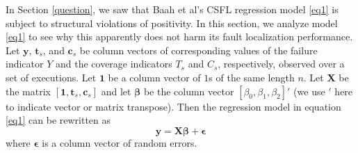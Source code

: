 In Section \ref{question}, we saw that Baah et al’s CSFL regression model \eqref{eq1} is subject to structural violations of positivity.  In this section, we analyze model \eqref{eq1} to see why this apparently does not harm its fault localization performance.  Let $\mathbf{y}$, $\mathbf{t}_s$, and $\mathbf{c}_s$ be column vectors of corresponding values of the failure indicator $Y$ and the coverage indicators $T_s$ and $C_s$, respectively, observed over a set of executions.  Let $\mathbf{1}$ be a column vector of $1$s of the same length $n$.  Let $\mathbf{X}$ be the matrix $[\mathbf{1}, \mathbf{t}_s, \mathbf{c}_s]$ and let $\mathbf{\beta}$ be the column vector $[\beta_0, \beta_1, \beta_2]'$ (we use $'$ here to indicate vector or matrix transpose). Then the regression model in equation \eqref{eq1} can be rewritten as
\begin{equation}\label{eq2}
\mathbf{y}=\mathbf{X} \bm{\beta}+\bm{\epsilon}
\end{equation}
where $\bm{\epsilon}$ is a column vector of random errors.

